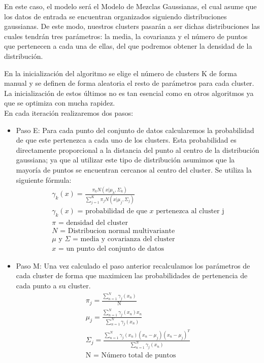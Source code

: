 \documentclass[conference,a4paper]{IEEEtran}
\begin{document}
En este caso, el modelo será el Modelo de Mezclas Gaussianas, el cual asume que los datos de entrada se encuentran organizados siguiendo distribuciones gaussianas. De este modo, nuestros clusters pasarán a ser dichas distribuciones las cuales tendrán tres parámetros: la media, la covarianza y el número de puntos que pertenecen a cada una de ellas, del que podremos obtener la densidad de la distribución.

En la inicialización del algoritmo se elige el número de clusters K de forma manual y se definen de forma aleatoria el resto de parámetros para cada cluster. La inicialización de estos últimos no es tan esencial como en otros algoritmos ya que se optimiza con mucha rapidez.\\
En cada iteración realizaremos dos pasos:

\begin{itemize}
	\item Paso E: Para cada punto del conjunto de datos calcularemos la probabilidad de que este pertenezca a cada uno de los clusters. Esta probabilidad es directamente proporcional a la distancia del punto al centro de la distribución gaussiana; ya que al utilizar este tipo de distribución asumimos que la mayoría de puntos se encuentran cercanos al centro del cluster. Se utiliza la siguiente fórmula:
\begin{gather}
\gamma_{k}(x)=\frac{\pi_{k}\textit{N}(x|\mu_{k},\Sigma_{k})}{\sum_{j=1}^{K}\pi_{j}\textit{N}(x|\mu_{j},\Sigma_{j})}\\
\gamma_{k}(x) \text{ = probabilidad de que } x \text{ pertenezca al cluster j}\\
\pi \text{ = densidad del cluster }\\
\textit{N}\text{ = Distribucion normal multivariante}\\
\mu \text{ y } \Sigma \text{ = media y covarianza del cluster}\\
x \text{ = un punto del conjunto de datos}
\end{gather}
\newpage
\item Paso M: Una vez calculado el paso anterior recalculamos los parámetros de cada cluster de forma que maximicen las probabilidades de pertenencia de cada punto a su cluster.
\begin{gather}
\pi_{j}=\frac{\sum_{n=1}^{N}\gamma_{j}(x_{n})}{\text{N}} \\
\mu_{j}=\frac{\sum_{n=1}^{N}\gamma_{j}(x_{n})x_{n}}{\sum_{n=1}^{N}\gamma_{j}(x_{n})}\\
\Sigma_{j}=\frac{\sum_{n=1}^{N}\gamma_{j}(x_{n})(x_{n}-\mu_{j})(x_{n}-\mu_{j})^T}{\sum_{n=1}^{N}\gamma_{j}(x_{n})}\\
\text{N = Número total de puntos}
\end{gather}

\end{itemize}
\end{document}
